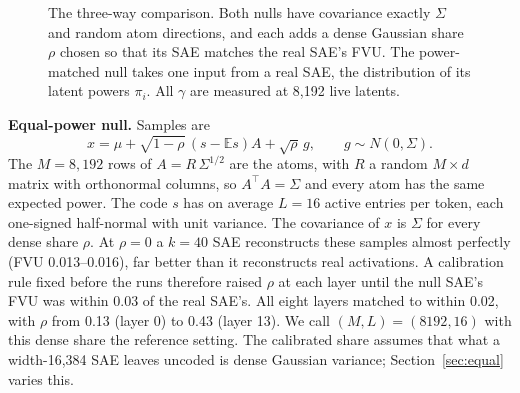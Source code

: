 \documentclass{article}
\newcommand{\Sig}{\Sigma}
\begin{document}
\begin{figure}[t]
\centering
{}
\caption{The three-way comparison. Both nulls have covariance exactly $\Sig$ and random atom directions, and each adds a dense Gaussian share $\rho$ chosen so that its SAE matches the real SAE's FVU. The power-matched null takes one input from a real SAE, the distribution of its latent powers $\pi_i$. All $\gamma$ are measured at 8,192 live latents.}
\label{fig:schematic}
\end{figure}

\textbf{Equal-power null.} Samples are
\[ x = \mu + \sqrt{1-\rho}\,(s-\mathbb{E}s)A + \sqrt{\rho}\,g, \qquad g \sim N(0,\Sig). \]
The $M=8{,}192$ rows of $A = R\,\Sig^{1/2}$ are the atoms, with $R$ a random $M\times d$ matrix with orthonormal columns, so $A^\top A = \Sig$ and every atom has the same expected power. The code $s$ has on average $L=16$ active entries per token, each one-signed half-normal with unit variance. The covariance of $x$ is $\Sig$ for every dense share $\rho$. At $\rho=0$ a $k=40$ SAE reconstructs these samples almost perfectly (FVU 0.013--0.016), far better than it reconstructs real activations. A calibration rule fixed before the runs therefore raised $\rho$ at each layer until the null SAE's FVU was within 0.03 of the real SAE's. All eight layers matched to within 0.02, with $\rho$ from 0.13 (layer 0) to 0.43 (layer 13). We call $(M,L)=(8192,16)$ with this dense share the reference setting. The calibrated share assumes that what a width-16,384 SAE leaves uncoded is dense Gaussian variance; Section~\ref{sec:equal} varies this.
\end{document}
